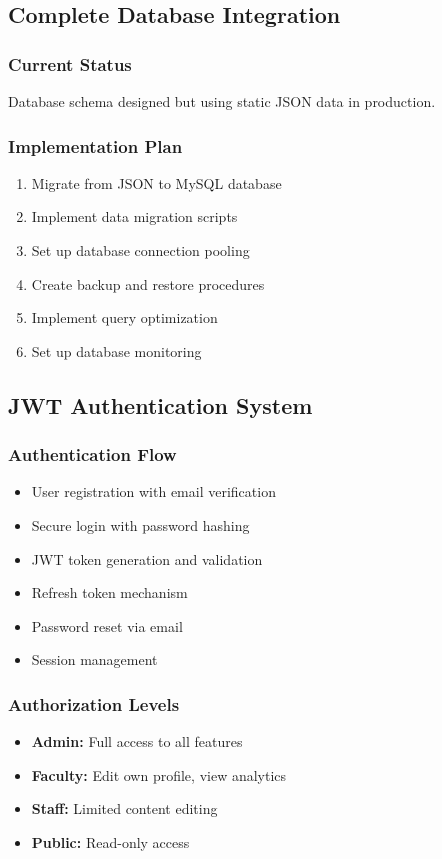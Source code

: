 \documentclass[12pt,a4paper]{report}
\begin{document}
\subsection{Complete Database Integration}

\subsubsection*{Current Status}
Database schema designed but using static JSON data in production.

\subsubsection*{Implementation Plan}
\begin{enumerate}
    \item Migrate from JSON to MySQL database
    \item Implement data migration scripts
    \item Set up database connection pooling
    \item Create backup and restore procedures
    \item Implement query optimization
    \item Set up database monitoring
\end{enumerate}

\subsection{JWT Authentication System}

\subsubsection*{Authentication Flow}
\begin{itemize}
    \item User registration with email verification
    \item Secure login with password hashing
    \item JWT token generation and validation
    \item Refresh token mechanism
    \item Password reset via email
    \item Session management
\end{itemize}

\subsubsection*{Authorization Levels}
\begin{itemize}
    \item \textbf{Admin:} Full access to all features
    \item \textbf{Faculty:} Edit own profile, view analytics
    \item \textbf{Staff:} Limited content editing
    \item \textbf{Public:} Read-only access
\end{itemize}
\end{document}
